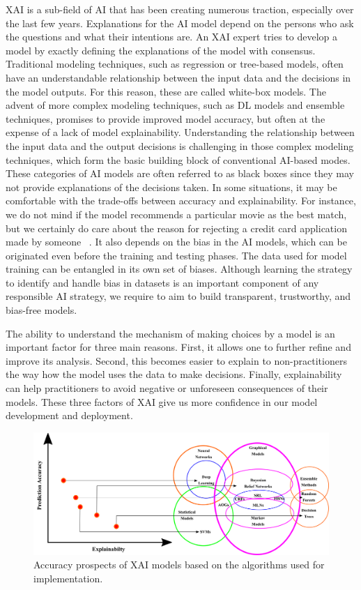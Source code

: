 \documentclass[journal]{IEEEtran}
\begin{document}
XAI is a sub-field of AI that has been creating numerous traction, especially over the last few years. Explanations for the AI model depend on the persons who ask the questions and what their intentions are. An XAI expert tries to develop a model by exactly defining the explanations of the model with consensus. Traditional modeling techniques, such as regression or tree-based models, often have an understandable relationship between the input data and the decisions in the model outputs. For this reason, these are called white-box models. The advent of more complex modeling techniques, such as DL models and ensemble techniques, promises to provide improved model accuracy, but often at the expense of a lack of model explainability. Understanding the relationship between the input data and the output decisions is challenging in those complex modeling techniques, which form the basic building block of conventional AI-based modes. These categories of AI models are often referred to as black boxes since they may not provide explanations of the decisions taken. In some situations, it may be comfortable with the trade-offs between accuracy and explainability. For instance, we do not mind if the model recommends a particular movie as the best match, but we certainly do care about the reason for rejecting a credit card application made by someone ~\cite{kute2021deep}. It also depends on the bias in the AI models, which can be originated even before the training and testing phases. The data used for model training can be entangled in its own set of biases. Although learning the strategy to identify and handle bias in datasets is an important component of any responsible AI strategy, we require to aim to build transparent, trustworthy, and bias-free models.

The ability to understand the mechanism of making choices by a model is an important factor for three main reasons. First, it allows one to further refine and improve its analysis. Second, this becomes easier to explain to non-practitioners the way how the model uses the data to make decisions. Finally, explainability can help practitioners to avoid negative or unforeseen consequences of their models. These three factors of XAI give us more confidence in our model development and deployment.

\begin{figure}
  \centering \includegraphics[width=\textwidth]{figures/Accuracy.png}
   \caption{Accuracy prospects of XAI models based on the algorithms used for implementation.}
   \label{fig:Accuracy}
\end{figure}
\end{document}
